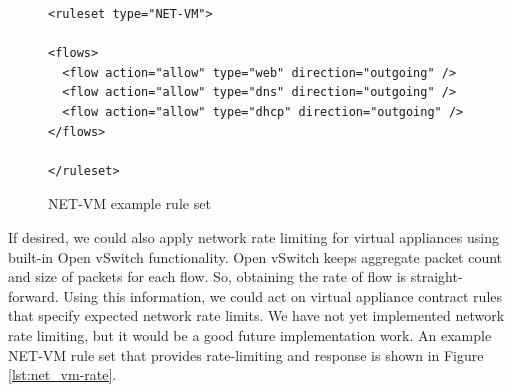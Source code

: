 \begin{figure}[tbp]
\caption{NET-VM example rule set}
\label{lst:net_vm}

\begin{lstlisting}
<ruleset type="NET-VM">

<flows>
  <flow action="allow" type="web" direction="outgoing" />
  <flow action="allow" type="dns" direction="outgoing" />
  <flow action="allow" type="dhcp" direction="outgoing" />
</flows>

</ruleset>
\end{lstlisting}
\end{figure}

If desired, we could also apply network rate limiting for virtual appliances using built-in Open vSwitch functionality. Open vSwitch keeps aggregate packet count and size of packets for each flow. So, obtaining the rate of flow is straight-forward. Using this information, we could act on virtual appliance contract rules that specify expected network rate limits. We have not yet implemented network rate limiting, but it would be a good future implementation work.  An example NET-VM rule set that provides rate-limiting and response is shown in Figure \ref{lst:net_vm-rate}.

